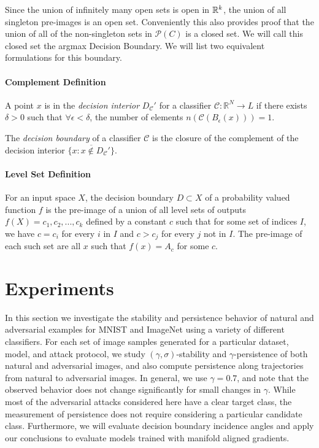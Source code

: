 Since the union of infinitely many open sets is open in
$\mathbb{R}^k$, the union of all singleton pre-images is an open
set. Conveniently this also provides proof that the union of all of
the non-singleton sets in $\mathcal{P}(C)$ is a closed set. We will
call this closed set the argmax Decision Boundary. We will list two
equivalent formulations for this boundary.  

\paragraph{Complement Definition}

A point $x$ is in the \emph{decision interior} $D_{\mathcal{C}}'$ for
a classifier $\mathcal{C}: \mathbb{R}^N \to L$ if there exists $\delta
> 0$ such that $\forall \epsilon < \delta$, the number of elements $n(\mathcal{C}(B_\epsilon(x))) = 1$. 

The \emph{decision boundary} of a classifier $\mathcal{C}$ is the closure of the complement of the decision interior $\overline{\{x : x \notin D_{\mathcal{C}}'\}}$. 

\paragraph{Level Set Definition}

For an input space $X$, the decision boundary $D \subset X$ of a probability valued function $f$ is the pre-image of a union of all level sets of outputs $f(X) = {c_1, c_2, ..., c_k}$ defined by a constant $c$ such that for some set of indices $I$, we have $c = c_i$ for every $i$ in $I$ and $c > c_j$ for every $j$ not in $I$. The pre-image of each such set are all $x$ such that $f(x) = A_c$ for some $c$. 


\section{Experiments} \label{sec:experiments}

In this section we investigate the stability and persistence behavior of natural and adversarial examples for MNIST \citep{MNIST} and ImageNet \citep{ILSVRC15} using a variety of different classifiers. For each set of image samples generated for a particular dataset, model, and attack protocol, we study $(\gamma,\sigma)$-stability and $\gamma$-persistence of both natural and adversarial images, and also compute persistence along trajectories from natural to adversarial images. In general, we use $\gamma = 0.7$, and note that the observed behavior does not change significantly for small changes in $\gamma$. While most of the adversarial attacks considered here have a clear target class, the measurement of persistence does not require considering a particular candidate class.  Furthermore, we will evaluate decision boundary incidence angles and apply our conclusions to evaluate models trained with manifold aligned gradients. 

